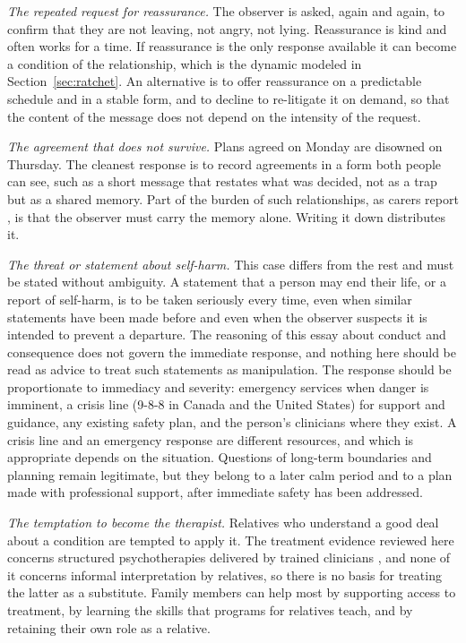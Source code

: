 \documentclass[11pt]{article}
\theoremstyle{definition}
\theoremstyle{remark}
\begin{document}
\emph{The repeated request for reassurance.} The observer is asked, again and again, to confirm that they are not leaving, not angry, not lying. Reassurance is kind and often works for a time. If reassurance is the only response available it can become a condition of the relationship, which is the dynamic modeled in Section~\ref{sec:ratchet}. An alternative is to offer reassurance on a predictable schedule and in a stable form, and to decline to re-litigate it on demand, so that the content of the message does not depend on the intensity of the request.

\emph{The agreement that does not survive.} Plans agreed on Monday are disowned on Thursday. The cleanest response is to record agreements in a form both people can see, such as a short message that restates what was decided, not as a trap but as a shared memory. Part of the burden of such relationships, as carers report \citep{bailey2013}, is that the observer must carry the memory alone. Writing it down distributes it.

\emph{The threat or statement about self-harm.} This case differs from the rest and must be stated without ambiguity. A statement that a person may end their life, or a report of self-harm, is to be taken seriously every time, even when similar statements have been made before and even when the observer suspects it is intended to prevent a departure. The reasoning of this essay about conduct and consequence does not govern the immediate response, and nothing here should be read as advice to treat such statements as manipulation. The response should be proportionate to immediacy and severity: emergency services when danger is imminent, a crisis line (9-8-8 in Canada and the United States) for support and guidance, any existing safety plan, and the person's clinicians where they exist. A crisis line and an emergency response are different resources, and which is appropriate depends on the situation. Questions of long-term boundaries and planning remain legitimate, but they belong to a later calm period and to a plan made with professional support, after immediate safety has been addressed.

\emph{The temptation to become the therapist.} Relatives who understand a good deal about a condition are tempted to apply it. The treatment evidence reviewed here concerns structured psychotherapies delivered by trained clinicians \citep{apa2024,storebo2020}, and none of it concerns informal interpretation by relatives, so there is no basis for treating the latter as a substitute. Family members can help most by supporting access to treatment, by learning the skills that programs for relatives teach, and by retaining their own role as a relative.
\end{document}
